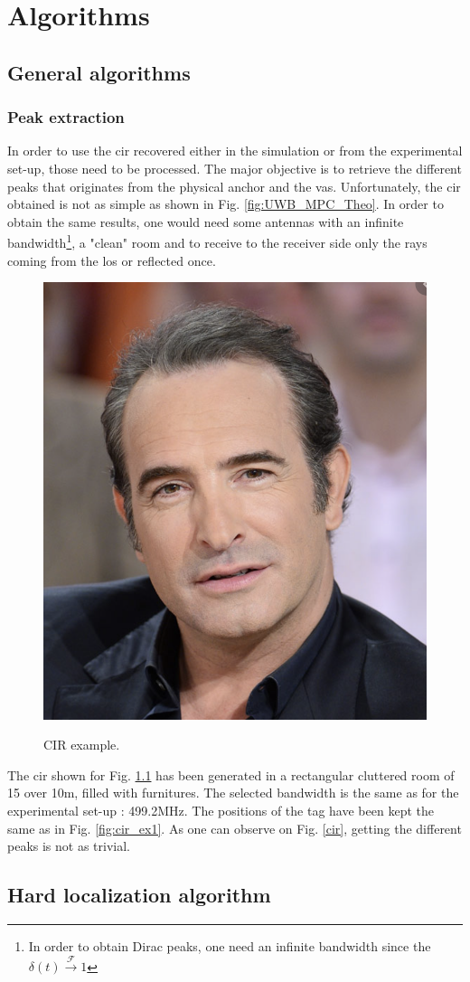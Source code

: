 \chapter{Algorithms}

\section{General algorithms}

\subsection{Peak extraction}

In order to use the \gls{cir} recovered either in the simulation or from the experimental set-up, those need to be processed. The major objective is to retrieve the different peaks that originates from the physical anchor and the \gls{vas}. Unfortunately, the \gls{cir} obtained is not as simple as shown in Fig. \ref{fig:UWB_MPC_Theo}. In order to obtain the same results, one would need some antennas with an infinite bandwidth\footnote{In order to obtain Dirac peaks, one need an infinite bandwidth since the $\delta(t) \xrightarrow{\mathscr{F}} 1 $}, a "clean" room and to receive to the receiver side only the rays coming from the \gls{los} or reflected once.
\vspace{2mm}

\begin{figure}[H]
\centering
\includegraphics[width=.2\linewidth]{Images/Temporary_pic.png}
\label{fig:cir_example}
\caption{CIR example.}
\end{figure}

The \gls{cir} shown for Fig. \ref{fig:cir_example} has been generated in a rectangular cluttered room of 15 over 10m, filled with furnitures. The selected bandwidth is the same as for the experimental set-up : 499.2MHz. The positions of the tag have been kept the same as in Fig. \ref{fig:cir_ex1}. As one can observe on Fig. \ref{cir}, getting the different peaks is not as trivial.

\section{Hard localization algorithm}



